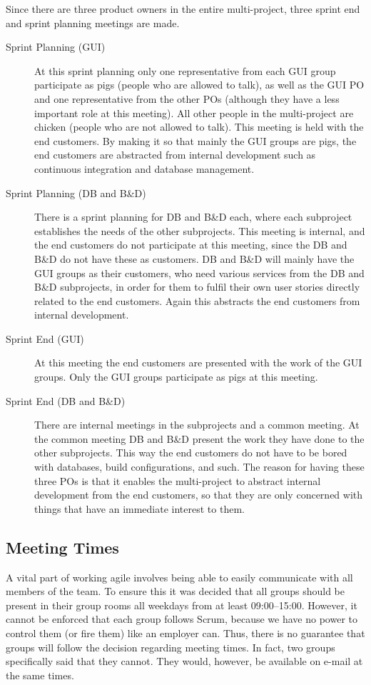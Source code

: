 Since there are three product owners in the entire multi-project, three sprint end and sprint planning meetings are made.

\begin{description}
  \item[Sprint Planning (GUI)] At this sprint planning only one representative from each GUI group participate as pigs (people who are allowed to talk), as well as the GUI PO and one representative from the other POs (although they have a less important role at this meeting). All other people in the multi-project are chicken (people who are not allowed to talk). This meeting is held with the end customers. By making it so that mainly the GUI groups are pigs, the end customers are abstracted from internal development such as continuous integration and database management.
  \item[Sprint Planning (DB and B\&D)] There is a sprint planning for DB and B\&D each, where each subproject establishes the needs of the other subprojects. This meeting is internal, and the end customers do not participate at this meeting, since the DB and B\&D do not have these as customers. DB and B\&D will mainly  have the GUI groups as their customers, who need various services from the DB and B\&D subprojects, in order for them to fulfil their own user stories directly related to the end customers. Again this abstracts the end customers from internal development.
  \item[Sprint End (GUI)] At this meeting the end customers are presented with the work of the GUI groups. Only the GUI groups participate as pigs at this meeting.
  \item[Sprint End (DB and B\&D)] There are internal meetings in the subprojects and a common meeting. At the common meeting DB and B\&D present the work they have done to the other subprojects. This way the end customers do not have to be bored with databases, build configurations, and such. The reason for having these three POs is that it enables the multi-project to abstract internal development from the end customers, so that they are only concerned with things that have an immediate interest to them.
\end{description}

\subsection{Meeting Times}
A vital part of working agile involves being able to easily communicate with all members of the team. To ensure this it was decided that all groups should be present in their group rooms all weekdays from at least 09:00--15:00. However, it cannot be enforced that each group follows Scrum, because we have no power to control them (or fire them) like an employer can. Thus, there is no guarantee that groups will follow the decision regarding meeting times. In fact, two groups specifically said that they cannot. They would, however, be available on e-mail at the same times.

